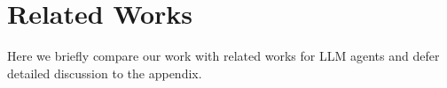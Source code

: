 \section{Related Works}

Here we briefly compare our work with related works for LLM agents and defer detailed discussion to the appendix.


